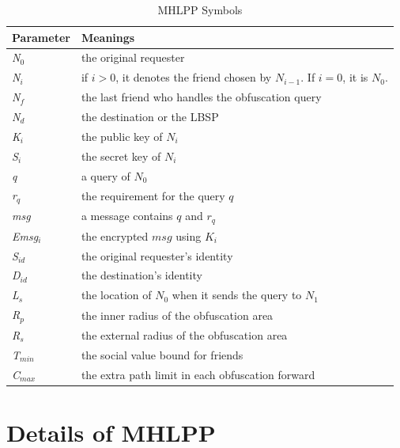 \begin{table}
\label{table:MhlppSymbols}
\caption{MHLPP Symbols}
\centering
\begin{tabular}{|p{1.2in}|p{3.7in}|} \hline 
Parameter & Meanings \\ \hline 
\textit{N${}_{0}$} & the original requester \\ \hline 
\textit{N${}_{i}$} & if $i>0$, it denotes the friend chosen by ${N}_{i-1}$. \newline If $i=0$, it is ${N}_{0}$. \\ \hline 
\textit{N${}_{f}$} & the last friend who handles the obfuscation query \\ \hline 
\textit{N${}_{d}$} & the destination or the LBSP \\ \hline 
\textit{K${}_{i}$} & the public key of $N_i$ \\ \hline 
\textit{S${}_{i}$} & the secret key of $N_i$  \\ \hline 
\textit{q} & a query of $N_0$ \\ \hline 
\textit{r${}_{q}$} & the requirement for the query $q$ \\ \hline 
\textit{msg} & a message contains $q$ and ${r}_{q}$ \\ \hline 
\textit{Emsg${}_{i}$} & the encrypted $msg$ using ${K}_{i}$ \\ \hline 
\textit{S${}_{id}$} & the original requester's identity \\ \hline 
\textit{D${}_{id}$} & the destination's identity \\ \hline 
\textit{L${}_{s}$} & the location of ${N}_{0}$ when it sends the query to ${N}_{1}$ \\ \hline 
\textit{R${}_{p}$} & the inner radius of the obfuscation area \\ \hline 
\textit{R${}_{s}$} & the external radius of the obfuscation area  \\ \hline 
\textit{T${}_{min}$} & the social value bound for friends \\ \hline 
\textit{C${}_{max}$} & the extra path limit in each obfuscation forward \\ \hline 
\end{tabular}
\end{table}


\section{ Details of MHLPP}


